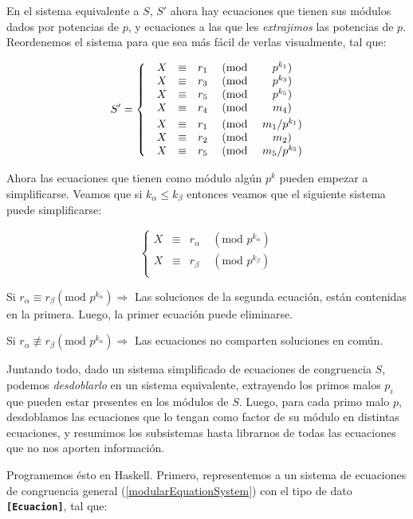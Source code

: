 \documentclass{article}
\newcommand{\mono}[1]{\textbf{\texttt{#1}}}
\newcommand{\nln}{\par\vspace{3mm}}
\begin{document}
En el sistema equivalente a $S$, $S'$ ahora hay ecuaciones que tienen sus módulos dados por potencias de $p$, y ecuaciones a las que les \textit{extrajimos} las potencias de $p$. Reordenemos el sistema para que sea más fácil de verlas visualmente, tal que:

\begin{equation*}
S' =  
\left\{\begin{matrix}
 &X &\equiv &r_1 \; &(\text{mod } &{p^{k_1}})             \\
 &X &\equiv &r_3 \; &(\text{mod } &p^{k_3})               \\
 &X &\equiv &r_5 \; &(\text{mod } &p^{k_5})               \\
 
 \vspace{1mm}
 
 &X &\equiv &r_4 \; &(\text{mod } &m_4)                   \\
 &X &\equiv &r_1 \; &(\text{mod } &m_1 / p^{k_1})         \\
 &X &\equiv &r_2 \; &(\text{mod } &m_2)                   \\
 &X &\equiv &r_5 \; &(\text{mod } &m_5 / p^{k_5})         \\
\end{matrix}\right.
\end{equation*}
\nln

Ahora las ecuaciones que tienen como módulo algún $p^k$ pueden empezar a simplificarse. Veamos que si $k_{\alpha} \leqslant k_{\beta}$ entonces veamos que el siguiente sistema puede simplificarse:

\begin{equation*}
\left\{\begin{matrix}
X &\equiv &r_{\alpha} \; &(\text{mod } p^{k_{\alpha}})  \\
X &\equiv &r_{\beta} \; &(\text{mod } p^{k_{\beta}})  \\
\end{matrix}\right.
\end{equation*}
\nln

Si $r_{\alpha} \equiv r_{\beta} (\text{mod } p^{k_{\alpha}}) \Longrightarrow $ Las soluciones de la segunda ecuación, están contenidas en la primera. Luego, la primer ecuación puede eliminarse.
\nln
Si $r_{\alpha} \not \equiv r_{\beta} (\text{mod } p^{k_{\alpha}}) \Longrightarrow $ Las ecuaciones no comparten soluciones en común.
\newpage

Juntando todo, dado un sistema simplificado de ecuaciones de congruencia $S$, podemos \textit{desdoblarlo} en un sistema equivalente, extrayendo los primos malos $p_i$ que pueden estar presentes en los módulos de $S$. Luego, para cada primo malo $p$, desdoblamos las ecuaciones que lo tengan como factor de su módulo en distintas ecuaciones, y resumimos los subsistemas hasta librarnos de todas las ecuaciones que no nos aporten información.
\nln
Programemos ésto en Haskell. Primero, representemos a un sistema de ecuaciones de congruencia general (\ref{modularEquationSystem}) con el tipo de dato \mono{[Ecuacion]}, tal que:
\end{document}
